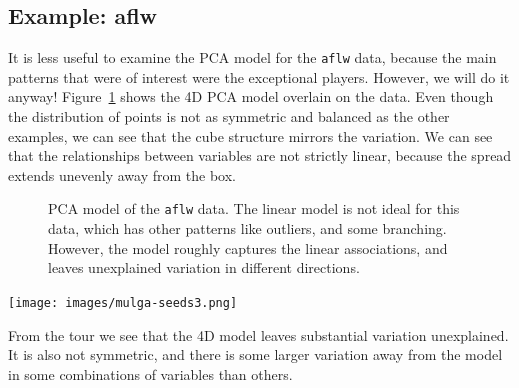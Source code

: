 \documentclass[
  letterpaper,
]{krantz}
\newcommand{\insightbox}[1]{%
\noindent\colorbox{insight!30}{%
\begin{minipage}{0.98\textwidth}%
    \centering%
    \begin{minipage}[c]{0.15\textwidth} %
      \texttt{[image: images/mulga-seeds3.png]} %
    \end{minipage}%
    \hfill %
    \begin{minipage}[c]{0.8\textwidth} %
      \bigskip%
      \textsf{#1}%
      \bigskip%
    \end{minipage}%
    \hspace*{3mm}%
  \end{minipage}%
}%
}
\begin{document}
\subsection{Example: aflw}\label{example-aflw-1}


It is less useful to examine the PCA model for the \texttt{aflw} data,
because the main patterns that were of interest were the exceptional
players. However, we will do it anyway! Figure~\ref{fig-aflw-model-pdf}
shows the 4D PCA model overlain on the data. Even though the
distribution of points is not as symmetric and balanced as the other
examples, we can see that the cube structure mirrors the variation. We
can see that the relationships between variables are not strictly
linear, because the spread extends unevenly away from the box.

\begin{figure}


\caption{\label{fig-aflw-model-pdf}PCA model of the \texttt{aflw} data.
The linear model is not ideal for this data, which has other patterns
like outliers, and some branching. However, the model roughly captures
the linear associations, and leaves unexplained variation in different
directions. }

\end{figure}%

\insightbox{From the tour we see that the 4D model leaves substantial variation unexplained. It is also not symmetric, and there is some larger variation away from the model in some combinations of variables than others.}
\end{document}
